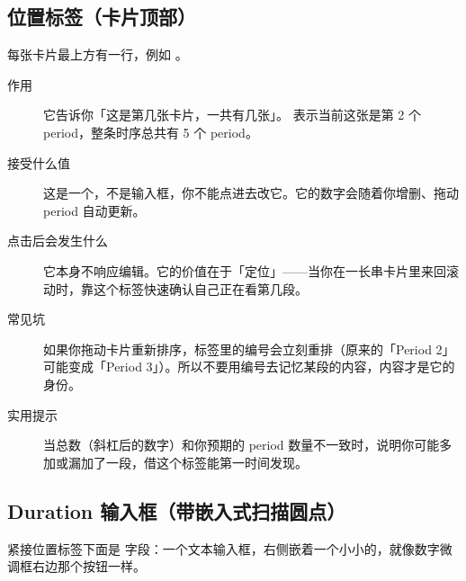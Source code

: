 \documentclass[11pt,oneside,openany]{book}
\begin{document}
\subsection{位置标签（卡片顶部）}

每张卡片最上方有一行，例如 。

\begin{description}
\item[作用] 它告诉你「这是第几张卡片，一共有几张」。 表示当前这张是第 2 个 period，整条时序总共有 5 个 period。
\item[接受什么值] 这是一个，不是输入框，你不能点进去改它。它的数字会随着你增删、拖动 period 自动更新。
\item[点击后会发生什么] 它本身不响应编辑。它的价值在于「定位」——当你在一长串卡片里来回滚动时，靠这个标签快速确认自己正在看第几段。
\item[常见坑] 如果你拖动卡片重新排序，标签里的编号会立刻重排（原来的「Period 2」可能变成「Period 3」）。所以不要用编号去记忆某段的内容，内容才是它的身份。
\item[实用提示] 当总数（斜杠后的数字）和你预期的 period 数量不一致时，说明你可能多加或漏加了一段，借这个标签能第一时间发现。
\end{description}

\subsection{Duration 输入框（带嵌入式扫描圆点）}

紧接位置标签下面是  字段：一个文本输入框，右侧嵌着一个小小的，就像数字微调框右边那个按钮一样。
\end{document}
